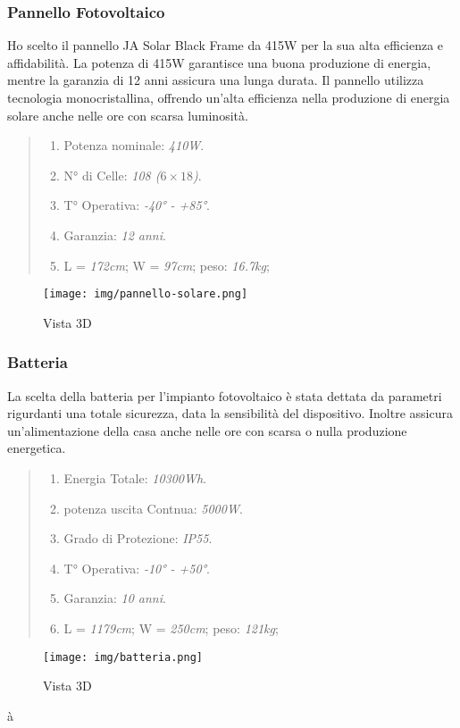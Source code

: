 \documentclass[italian, 12pt, a4paper]{article}
\begin{document}
\subsubsection{Pannello Fotovoltaico}
Ho scelto il pannello JA Solar Black Frame da 415W per la sua alta efficienza e affidabilità. La potenza di 415W garantisce una buona produzione di energia, mentre la garanzia di 12 anni assicura una lunga durata. Il pannello utilizza tecnologia monocristallina, offrendo un'alta efficienza nella produzione di energia solare anche nelle ore con scarsa luminosità.
\begin{quote}
    \begin{enumerate}
        \item Potenza nominale: \emph{410W}.
        \item N° di Celle: \emph{108 ($6\times 18$)}.
        \item T° Operativa: \emph{-40° - +85°}.
        \item Garanzia: \emph{12 anni}.
        \item L = \emph{172cm}; W = \emph{97cm}; peso: \emph{16.7kg};
    \end{enumerate}
\end{quote}
\vspace{-15px}
\begin{figure}[h]
    \centering
    \texttt{[image: img/pannello-solare.png]}
    \caption{Vista 3D}
    \label{fig:pannello-solare}
\end{figure}
\subsubsection{Batteria}
La scelta della batteria per l'impianto fotovoltaico è stata dettata da parametri rigurdanti una totale sicurezza, data la sensibilità del dispositivo. Inoltre assicura un'alimentazione della casa anche nelle ore con scarsa o nulla produzione energetica.
\begin{quote}
    \begin{enumerate}
        \item Energia Totale: \emph{10300Wh}.
        \item potenza uscita Contnua: \emph{5000W}.
        \item Grado di Protezione: \emph{IP55}.
        \item T° Operativa: \emph{-10° - +50°}.
        \item Garanzia: \emph{10 anni}.
        \item L = \emph{1179cm}; W = \emph{250cm}; peso: \emph{121kg};
    \end{enumerate}
\end{quote}
\vspace{-15px}
\begin{figure}[h]
    \centering
    \texttt{[image: img/batteria.png]}
    \caption{Vista 3D}
    \label{fig:batteria}
\end{figure}
à
\clearpage
\end{document}
